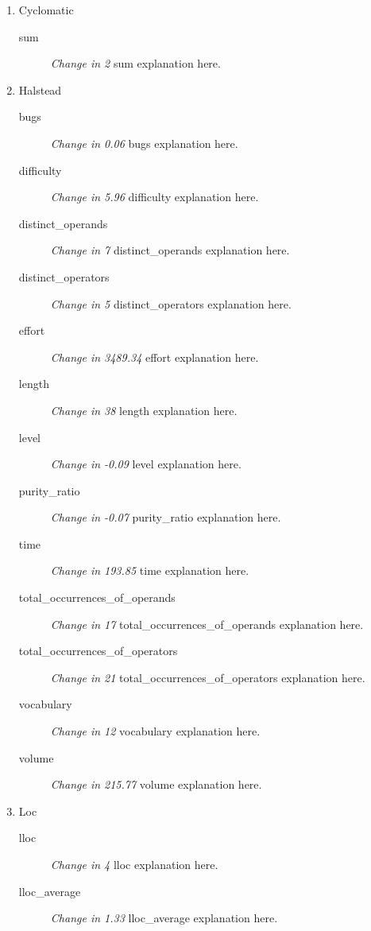 \begin{enumerate}
      \item Cyclomatic
            \begin{description}
                  \item [sum] \textit{Change in 2} sum explanation here.
            \end{description}
      \item Halstead
            \begin{description}
                  \item [bugs] \textit{Change in 0.06} bugs explanation here.
                  \item [difficulty] \textit{Change in 5.96} difficulty explanation here.
                  \item [distinct\_operands] \textit{Change in 7} distinct\_operands explanation here.
                  \item [distinct\_operators] \textit{Change in 5} distinct\_operators explanation here.
                  \item [effort] \textit{Change in 3489.34} effort explanation here.
                  \item [length] \textit{Change in 38} length explanation here.
                  \item [level] \textit{Change in -0.09} level explanation here.
                  \item [purity\_ratio] \textit{Change in -0.07} purity\_ratio explanation here.
                  \item [time] \textit{Change in 193.85} time explanation here.
                  \item [total\_occurrences\_of\_operands] \textit{Change in 17} total\_occurrences\_of\_operands explanation here.
                  \item [total\_occurrences\_of\_operators] \textit{Change in 21} total\_occurrences\_of\_operators explanation here.
                  \item [vocabulary] \textit{Change in 12} vocabulary explanation here.
                  \item [volume] \textit{Change in 215.77} volume explanation here.
            \end{description}
      \item Loc
            \begin{description}
                  \item [lloc] \textit{Change in 4} lloc explanation here.
                  \item [lloc\_average] \textit{Change in 1.33} lloc\_average explanation here.

\end{description}
\end{enumerate}
